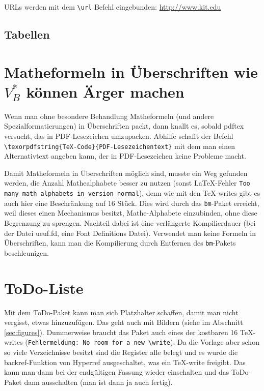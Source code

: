 URLs werden mit dem \verb+\url+ Befehl eingebunden: \url{http://www.kit.edu}

\subsection{Tabellen}


\section{Matheformeln in Überschriften wie \texorpdfstring{$V^*_{B}$}{zum Beispiel V\_B} können Ärger machen}

Wenn man ohne besondere Behandlung Matheformeln (und andere Spezialformatierungen) in Überschriften packt, dann knallt es, sobald pdftex versucht, das in PDF-Lesezeichen umzupacken. Abhilfe schafft der Befehl \texttt{\textbackslash texorpdfstring\{\TeX-Code\}\{PDF-Lesezeichentext\}} mit dem man einen Alternativtext angeben kann, der in PDF-Lesezeichen keine Probleme macht.

Damit Matheformeln in Überschriften möglich sind, musste ein Weg gefunden werden, die Anzahl Mathealphabete besser zu nutzen (sonst \LaTeX-Fehler \texttt{Too many math alphabets in version normal}), denn wie mit den \TeX-writes gibt es auch hier eine Beschränkung auf 16 Stück. Dies wird durch das \texttt{bm}-Paket erreicht, weil dieses einen Mechanismus besitzt, Mathe-Alphabete einzubinden, ohne diese Begrenzung zu sprengen. Nachteil dabei ist eine verlängerte Kompilierdauer (\zb bei der Datei ueuf.fd, eine Font Definitions Datei). Verwendet man keine Formeln in Überschriften, kann man die Kompilierung durch Entfernen des \texttt{bm}-Pakets beschleunigen.

\section{ToDo-Liste}

 Mit dem ToDo-Paket kann man sich Platzhalter schaffen, damit man nicht vergisst, etwas hinzuzufügen. Das geht auch mit Bildern (siehe im Abschnitt \ref{sec:figures}). Dummerweise braucht das Paket auch eines der kostbaren 16 \TeX-writes (\texttt{Fehlermeldung: No room for a new \textbackslash write}). Da die Vorlage aber schon so viele Verzeichnisse besitzt sind die Register alle belegt und es wurde die backref-Funktion von Hyperref ausgeschaltet, was ein \TeX-write freigibt.  Das kann man dann bei der endgültigen Fassung wieder einschalten und das ToDo-Paket dann ausschalten (man ist dann ja auch fertig).


